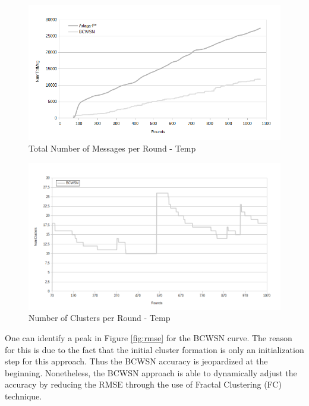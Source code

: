 \documentclass{acm_proc_article-sp}
\begin{document}
\begin{figure}[!htb]
\begin{center}
	\includegraphics[scale=0.40]{BCWSN-TotNumMsgxRound-PB-2Appr.png}
    \caption{Total Number of Messages per Round - Temp}
    \label{fig:tot-num-msg}
\end{center}
\end{figure}
\vspace*{-.3cm}

\begin{figure}[!htb]
\begin{center}
	\includegraphics[scale=0.33]{BCWSN-NumClustersxRound-PB.png}
    \caption{Number of Clusters per Round - Temp}
    \label{fig:num-clts}
\end{center}
\end{figure}
\vspace*{-.3cm}

One can identify a peak in Figure \ref{fig:rmse} for the BCWSN curve. The reason
for this is due to the fact that the initial cluster formation is only an
initialization step for this approach. Thus the BCWSN accuracy is jeopardized 
at the beginning. Nonetheless, the BCWSN approach is able to dynamically adjust 
the accuracy by reducing the RMSE through the use of Fractal Clustering (FC) technique.
\vspace*{-.3cm}
\end{document}

